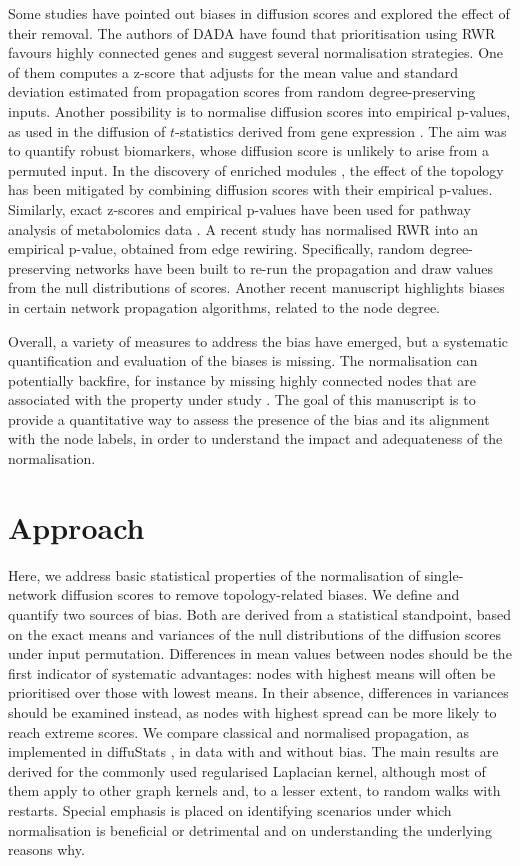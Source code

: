 \documentclass[final]{bioinfo}
\begin{document}
Some studies have pointed out biases in diffusion scores and explored the effect of their removal.
The authors of DADA \citep{erten2011dada} have found that prioritisation using RWR favours highly connected genes and suggest several normalisation strategies. 
One of them computes a z-score that adjusts for the mean value and standard deviation estimated from propagation scores from random degree-preserving inputs. 
Another possibility is to normalise diffusion scores into empirical p-values, as used in the diffusion of $t$-statistics derived from gene expression \citep{smoothedt}.
The aim was to quantify robust biomarkers, whose diffusion score is unlikely to arise from a permuted input. 
In the discovery of enriched modules \citep{mosca}, the effect of the topology has been mitigated by combining diffusion scores with their empirical p-values.
Similarly, exact z-scores and empirical p-values have been used for pathway analysis of metabolomics data \citep{metabopicart}.
A recent study \citep{biran2019comparative} has normalised RWR into an empirical p-value, obtained from edge rewiring. 
Specifically, random degree-preserving networks have been built to re-run the propagation and draw values from the null distributions of scores.
Another recent manuscript \citep{hill2019benchmarking} highlights biases in certain network propagation algorithms, related to the node degree.

Overall, a variety of measures to address the bias have emerged, but a systematic quantification and evaluation of the biases is missing. 
The normalisation can potentially backfire, for instance by missing highly connected nodes that are associated with the property under study \citep{erten2011dada}. 
The goal of this manuscript is to provide a quantitative way to assess the presence of the bias and its alignment with the node labels, in order to understand the impact and adequateness of the normalisation. 

\section{Approach}

Here, we address basic statistical properties of the normalisation of single-network diffusion scores to remove topology-related biases. 
We define and quantify two sources of bias.
Both are derived from a statistical standpoint, based on the exact means and variances of the null distributions of the diffusion scores under input permutation.
Differences in mean values between nodes should be the first indicator of systematic advantages: nodes with highest means will often be prioritised over those with lowest means. 
In their absence, differences in variances should be examined instead, as nodes with highest spread can be more likely to reach extreme scores.
We compare classical and normalised propagation, as implemented in diffuStats \citep{diffustats}, in data with and without bias.
The main results are derived for the commonly used regularised Laplacian kernel, although most of them apply to other graph kernels and, to a lesser extent, to random walks with restarts. 
Special emphasis is placed on identifying scenarios under which normalisation is beneficial or detrimental and on understanding the underlying reasons why.
\end{document}

